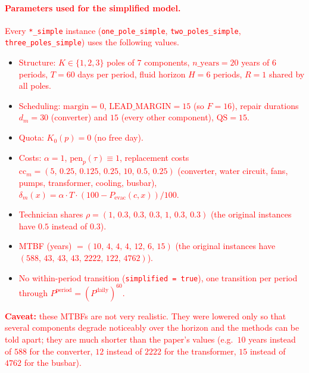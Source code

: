 \documentclass[11pt]{article}
\begin{document}
\paragraph{\textcolor{red}{Parameters used for the simplified model.}}
\textcolor{red}{Every \texttt{*\_simple} instance (\texttt{one\_pole\_simple},
\texttt{two\_poles\_simple}, \texttt{three\_poles\_simple}) uses the following values.}
\begin{itemize}
  \item \textcolor{red}{Structure: $K \in \{1,2,3\}$ poles of $7$ components, $n\_\mathrm{years} = 20$
  years of $6$ periods, $T = 60$ days per period, fluid horizon $H = 6$ periods, $R = 1$
  shared by all poles.}
  \item \textcolor{red}{Scheduling: $\mathrm{margin} = 0$, $\mathrm{LEAD\_MARGIN} = 15$ (so
  $F = 16$), repair durations $d_m = 30$ (converter) and $15$ (every other component),
  $\mathrm{QS} = 15$.}
  \item \textcolor{red}{Quota: $K_0(p) = 0$ (no free day).}
  \item \textcolor{red}{Costs: $\alpha = 1$, $\mathrm{pen}_p(\tau) \equiv 1$,
  replacement costs $\mathrm{cc}_m = (5,\,0.25,\,0.125,\,0.25,\,10,\,0.5,\,0.25)$ (converter,
  water circuit, fans, pumps, transformer, cooling, busbar), $\delta_m(x) = \alpha \cdot T \cdot
  (100 - P_{\mathrm{evac}}(c,x))/100$.}
  \item \textcolor{red}{Technician shares $\rho = (1,\,0.3,\,0.3,\,0.3,\,1,\,0.3,\,0.3)$
  (the original instances have $0.5$ instead of $0.3$).}
  \item \textcolor{red}{MTBF (years) $= (10,\,4,\,4,\,4,\,12,\,6,\,15)$ (the original instances
  have $(588,\,43,\,43,\,43,\,2222,\,122,\,4762)$).}
  \item \textcolor{red}{No within-period transition (\texttt{simplified = true}), one
  transition per period through $P^{\mathrm{period}} = (P^{\mathrm{daily}})^{60}$.}
\end{itemize}
\textcolor{red}{\textbf{Caveat:} these MTBFs are not very realistic. They were lowered only
so that several components degrade noticeably over the horizon and the methods can be told
apart; they are much shorter than the paper's values (e.g.\ $10$ years instead of $588$ for
the converter, $12$ instead of $2222$ for the transformer, $15$ instead of $4762$ for the
busbar).}
\end{document}
